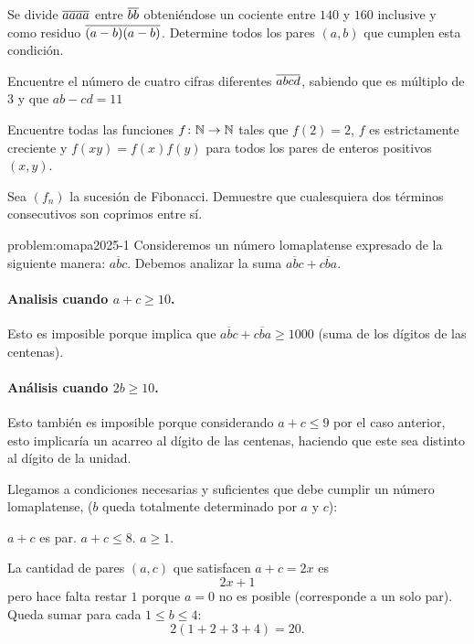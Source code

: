 \begin{problem}[OMAPA 2011/3]
Se divide $\overline{aaaa}$ entre $\overline{bb}$ obteniéndose
un cociente entre $140$ y $160$ inclusive y como residuo
$\overline{(a - b)(a - b)}$. Determine todos los pares $(a, b)$
que cumplen esta condición.
\end{problem}

\begin{problem}[OMAPA 2012/4]
Encuentre el número de cuatro cifras diferentes $\overline{abcd}$,
sabiendo que es múltiplo de $3$ y
que $ab - cd = 11$
\end{problem}

\begin{problem}
Encuentre todas las funciones $f\colon\mathbb N\to\mathbb N$ tales que $f(2) = 2$, $f$
es estrictamente creciente y $f(xy) = f(x)f(y)$ para todos los pares de
enteros positivos $(x, y)$.
\end{problem}

\begin{problem}
Sea $(f_n)$ la sucesión de Fibonacci.
Demuestre que cualesquiera dos
términos consecutivos son coprimos entre sí.
\end{problem}

\begin{solutiontoproblem}{problem:omapa2025-1}
	Consideremos un número lomaplatense expresado de la siguiente manera: $\overline{abc}$.
	Debemos analizar la suma $\overline{abc} + \overline{cba}$.

	\paragraph{Analisis cuando $a + c \geq 10$.} Esto es imposible
	porque implica que $\overline{abc} + \overline{cba} \geq 1000$
	(suma de los dígitos de las centenas).

	\paragraph{Análisis cuando $2b \geq 10$.} Esto también es imposible
	porque considerando $a + c \leq 9$ por el caso anterior,
	esto implicaría un acarreo al dígito
	de las centenas, haciendo que este sea distinto al dígito de
	la unidad.

	Llegamos a condiciones necesarias y suficientes que debe
	cumplir un número lomaplatense, ($b$ queda totalmente determinado
	por $a$ y $c$):
	\begin{itemize}
		\ii $a + c$ es par.
		\ii $a + c \leq 8$.
		\ii $a \geq 1$.
	\end{itemize}

	La cantidad de pares $\left(a, c\right)$
	que satisfacen $a + c = 2x$ es
	\[2x + 1\]
	pero hace falta restar $1$ porque $a = 0$
	no es posible (corresponde a un solo par).
	Queda sumar para cada $1 \leq b \leq 4$:
	\[2(1 + 2 + 3 + 4) = 20.\]
\end{solutiontoproblem}


